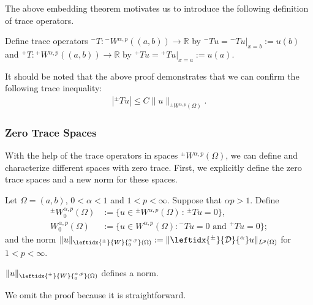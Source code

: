 \documentclass[leqno,final]{siamltex}
\numberwithin{equation}{section}
\renewcommand{\(}{\bigl(}
\renewcommand{\)}{\bigr)}
\newcommand{\R}{\mathbb{R}}
\begin{document}
The above embedding theorem motivates us to introduce the following definition of trace operators. 

    \begin{definition}
        Define trace operators ${^{-}}{T}: {^{-}}{W}{^{\alpha,p}}((a,b))\to \R$ by ${^{-}}{T}u={^{-}}{T}u|_{x=b} := u(b)$ and ${^{+}}{T}: {^{+}}{W}{^{\alpha,p}}((a,b))\to \R$ by ${^{+}}{T}u={^{+}}{T}u|_{x=a} := u(a)$.  
    \end{definition}
    
    It should be noted that the above proof demonstrates that we can confirm the following trace inequality: 
    \begin{align}\label{TraceInequality}
    	|{^{\pm}}{T} u | \leq C \|u\|_{{^{\pm}}{W}{^{\alpha,p}}(\Omega)}.
    \end{align}
    
    \subsubsection{\bf Zero Trace Spaces}\label{sec-4.3.1}
    With the help of the trace operators in spaces ${^{\pm}}{W}{^{\alpha,p}}(\Omega)$, 
    we can define and characterize different spaces with zero trace. First, we explicitly 
    define the zero trace spaces  and a new norm for these spaces.
 

    \begin{definition}
        Let $\Omega=(a,b)$, $0 < \alpha <1$ and $1 < p <\infty$. Suppose that  $\alpha p >1$.  Define  
        \begin{align*}
            {^{\pm}}{W}{^{\alpha,p}_{0}}(\Omega) &:= \{ u \in {^{\pm}}{W}{^{\alpha,p}}(\Omega) \,:\, {^{\pm}}{T} u = 0 \},\\
             {W}^{\alpha,p}_{0}(\Omega) &:= \{ u \in  {W}^{\alpha,p}(\Omega) : {^{-}}{T}u=0 \mbox{ and } {^{+}}{T}u = 0\};
        \end{align*}
    and the norm $\| u \|_{\leftidx{^{\pm}}{W}{^{\alpha,p}_{0}}(\Omega)} : = \|\leftidx{^{\pm}}{\mathcal{D}}{^{\alpha}} u \|_{L^{p}(\Omega)}$ for $1< p  <\infty$.
    \end{definition}
    
    \begin{proposition}\label{ZeroTraceNorm}
    $\| u \|_{\leftidx{^{\pm}}{W}{^{\alpha,p}_{0}}(\Omega)}$ defines a norm.
    \end{proposition}

We omit the proof because it is straightforward. 
    
\end{document}
